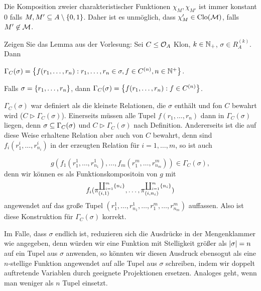 \documentclass{book}
\begin{document}
\begin{solution}
    Die Komposition zweier charakteristischer Funktionen $\chi_M, \chi_{M'}$ ist immer konstant $0$ falls $M,M'\subseteq A\setminus\left\{0,1\right\}$. Daher ist es unmöglich, dass $\chi_M'\in\mathrm{Clo}(\mathcal{M})$, falls $M'\not\in\mathcal{M}$.
\end{solution}

\begin{exercise}
    Zeigen Sie das Lemma aus der Vorlesung:
    Sei $C\leq \mathcal{O}_A$ Klon, $k\in\mathbb{N}_+$, $\sigma\in R_A^{(k)}$. Dann
    \begin{statements}
            \item $\Gamma_C(\sigma)=\left\{f(r_1,\ldots,r_n):r_1,\ldots,r_n\in\sigma,f\in C^{(n)},n\in\mathbb{N}^+\right\}$.
        \item Falls $\sigma=\left\{r_1,\ldots,r_n\right\}$, dann $\Gamma_C(\sigma)=\left\{f(r_1,\ldots,r_n):f\in C^{(n)}\right\}$.
    \end{statements}
\end{exercise}

\begin{solution}
    \begin{tasks}
        \item $\Gamma_C(\sigma)$ war definiert als die kleinste Relationen, die $\sigma$ enthält und fon $C$ bewahrt wird ($C\rhd \Gamma_C(\sigma)$). Einerseits müssen alle Tupel $f(r_1,\ldots,r_n)$ dann in $\Gamma_C(\sigma)$ liegen, denn $\sigma\subseteq\Gamma_C(\sigma)$ und $C\rhd \Gamma_C(\sigma)$ nach Definition.
    Andererseits ist die auf diese Weise erhaltene Relation aber auch von $C$ bewahrt, denn sind $f_i(r^i_1,\ldots,r^i_{n_i})$ in der erzeugten Relation für $i=1,\ldots,m$, so ist auch

    $$
    g(f_1(r^1_1,\ldots,r^1_{n_1}),\ldots,f_m(r^m_1,\ldots,r^m_{n_m}))\in\Gamma_C(\sigma),
    $$
    denn wir können es als Funktionskompositoin von $g$ mit
    $$f_i(\pi^{\coprod_{i=1}^m\left\{n_i\right\}}_{(i,1)},\ldots,\pi^{\coprod_{i=1}^m\left\{n_i\right\}}_{(i,n_i)})$$
    angewendet auf das große Tupel $(r^1_1,\ldots,r^1_{n_1},\ldots,r^m_1,\ldots,r^m_{n_m})$ auffassen. Also ist diese Konstruktion für $\Gamma_C(\sigma)$ korrekt.
        \item Im Falle, dass $\sigma$ endlich ist, reduzieren sich die Ausdrücke in der Mengenklammer wie angegeben, denn würden wir eine Funktion mit Stelligkeit größer als $\left|\sigma\right|=n$ auf ein Tupel aus $\sigma$ anwenden, so könnten wir diesen Ausdruck ebensogut als eine $n$-stellige Funktion angewendet auf alle Tupel aus $\sigma$ schreiben, indem wir doppelt auftretende Variablen durch geeignete Projektionen ersetzen.
    Analoges geht, wenn man weniger als $n$ Tupel einsetzt.
    \end{tasks}
\end{solution}
\end{document}
